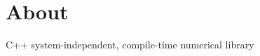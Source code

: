  \href{https://hub.docker.com/r/vyzyv/numpp/}{\tt } \href{https://www.codacy.com/app/vyz/numpp?utm_source=github.com&utm_medium=referral&utm_content=vyzyv/numpp&utm_campaign=badger}{\tt }

\section*{About }

C++ system-\/independent, compile-\/time numerical library 